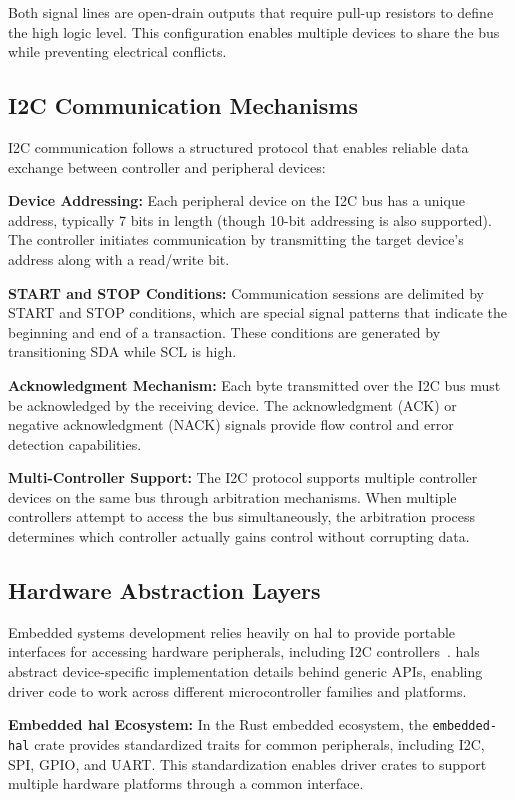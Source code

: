 Both signal lines are open-drain outputs that require pull-up resistors to define the high logic level. This configuration enables multiple devices to share the bus while preventing electrical conflicts.

\subsection{I2C Communication Mechanisms}
\label{subsec:i2c-communication}

I2C communication follows a structured protocol that enables reliable data exchange between controller and peripheral devices:

\textbf{Device Addressing:} Each peripheral device on the I2C bus has a unique address, typically 7 bits in length (though 10-bit addressing is also supported). The controller initiates communication by transmitting the target device's address along with a read/write bit.

\textbf{START and STOP Conditions:} Communication sessions are delimited by START and STOP conditions, which are special signal patterns that indicate the beginning and end of a transaction. These conditions are generated by transitioning SDA while SCL is high.

\textbf{Acknowledgment Mechanism:} Each byte transmitted over the I2C bus must be acknowledged by the receiving device. The acknowledgment (ACK) or negative acknowledgment (NACK) signals provide flow control and error detection capabilities.

\textbf{Multi-Controller Support:} The I2C protocol supports multiple controller devices on the same bus through arbitration mechanisms. When multiple controllers attempt to access the bus simultaneously, the arbitration process determines which controller actually gains control without corrupting data.

\subsection{Hardware Abstraction Layers}
\label{subsec:hal-embedded}

Embedded systems development relies heavily on \acrfull{hal} to provide portable interfaces for accessing hardware peripherals, including I2C controllers~\cite{hal}. \acrshort{hal}s abstract device-specific implementation details behind generic APIs, enabling driver code to work across different microcontroller families and platforms.

\textbf{Embedded \acrshort{hal} Ecosystem:} In the Rust embedded ecosystem, the \texttt{embedded-hal} crate provides standardized traits for common peripherals, including I2C, SPI, GPIO, and UART. This standardization enables driver crates to support multiple hardware platforms through a common interface.

